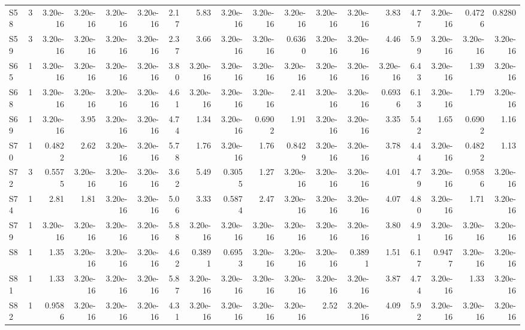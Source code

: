 {\begin{longtable}{lrrrrrrrrrrrrrrrrr}
  S58 & 3 & 3.20e-16 & 3.20e-16 & 3.20e-16 & 3.20e-16 & 2.17 & 5.83 & 3.20e-16 & 3.20e-16 & 3.20e-16 & 3.20e-16 & 3.20e-16 & 3.83 & 4.77 & 3.20e-16 & 0.4726 & 0.8280 \\
  S59 & 3 & 3.20e-16 & 3.20e-16 & 3.20e-16 & 3.20e-16 & 2.37 & 3.66 & 3.20e-16 & 3.20e-16 & 0.6360 & 3.20e-16 & 3.20e-16 & 4.46 & 5.99 & 3.20e-16 & 3.20e-16 & 3.20e-16 \\
  S65 & 1 & 3.20e-16 & 3.20e-16 & 3.20e-16 & 3.20e-16 & 3.80 & 3.20e-16 & 3.20e-16 & 3.20e-16 & 3.20e-16 & 3.20e-16 & 3.20e-16 & 3.20e-16 & 6.43 & 3.20e-16 & 1.39 & 3.20e-16 \\
  S68 & 1 & 3.20e-16 & 3.20e-16 & 3.20e-16 & 3.20e-16 & 4.61 & 3.20e-16 & 3.20e-16 & 3.20e-16 & 2.41 & 3.20e-16 & 3.20e-16 & 0.6936 & 6.13 & 3.20e-16 & 1.79 & 3.20e-16 \\
  S69 & 1 & 3.20e-16 & 3.95 & 3.20e-16 & 3.20e-16 & 4.74 & 1.34 & 3.20e-16 & 0.6902 & 1.91 & 3.20e-16 & 3.20e-16 & 3.35 & 5.42 & 1.65 & 0.6902 & 1.16 \\
  S70 & 1 & 0.4822 & 2.62 & 3.20e-16 & 3.20e-16 & 5.78 & 1.76 & 3.20e-16 & 1.76 & 0.8429 & 3.20e-16 & 3.20e-16 & 3.78 & 4.44 & 3.20e-16 & 0.4822 & 1.13 \\
  S72 & 3 & 0.5575 & 3.20e-16 & 3.20e-16 & 3.20e-16 & 3.62 & 5.49 & 0.3055 & 1.27 & 3.20e-16 & 3.20e-16 & 3.20e-16 & 4.01 & 4.79 & 3.20e-16 & 0.9586 & 3.20e-16 \\
  S74 & 1 & 2.81 & 1.81 & 3.20e-16 & 3.20e-16 & 5.06 & 3.33 & 0.5874 & 2.47 & 3.20e-16 & 3.20e-16 & 3.20e-16 & 4.07 & 4.80 & 3.20e-16 & 1.71 & 3.20e-16 \\
  S79 & 1 & 3.20e-16 & 3.20e-16 & 3.20e-16 & 3.20e-16 & 5.88 & 3.20e-16 & 3.20e-16 & 3.20e-16 & 3.20e-16 & 3.20e-16 & 3.20e-16 & 3.80 & 4.91 & 3.20e-16 & 3.20e-16 & 3.20e-16 \\
  S8 & 1 & 1.35 & 3.20e-16 & 3.20e-16 & 3.20e-16 & 4.62 & 0.3891 & 0.6953 & 3.20e-16 & 3.20e-16 & 3.20e-16 & 0.3891 & 1.51 & 6.17 & 0.9477 & 3.20e-16 & 3.20e-16 \\
  S81 & 1 & 1.33 & 3.20e-16 & 3.20e-16 & 3.20e-16 & 5.87 & 3.20e-16 & 3.20e-16 & 3.20e-16 & 3.20e-16 & 3.20e-16 & 3.20e-16 & 3.87 & 4.74 & 3.20e-16 & 1.33 & 3.20e-16 \\
  S82 & 1 & 0.9586 & 3.20e-16 & 3.20e-16 & 3.20e-16 & 4.31 & 3.20e-16 & 3.20e-16 & 3.20e-16 & 3.20e-16 & 2.52 & 3.20e-16 & 4.09 & 5.92 & 3.20e-16 & 3.20e-16 & 3.20e-16 \\
\end{longtable}
}
